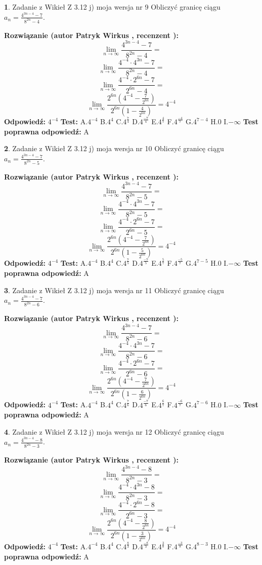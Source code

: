 \documentclass[12pt, a4paper]{article}
\theoremstyle{definition} %
\newtheorem{zad}{}
\newcommand{\zadStart}[1]{\begin{zad}#1\newline}
\newcommand{\zadStop}{\end{zad}}
\newcommand{\rozwStart}[2]{\noindent \textbf{Rozwiązanie (autor #1 , recenzent #2): }\newline}
\newcommand{\rozwStop}{\newline}
\newcommand{\odpStart}{\noindent \textbf{Odpowiedź:}\newline}
\newcommand{\odpStop}{\newline}
\newcommand{\testStart}{\noindent \textbf{Test:}\newline}
\newcommand{\testStop}{\newline}
\newcommand{\kluczStart}{\noindent \textbf{Test poprawna odpowiedź:}\newline}
\newcommand{\kluczStop}{\newline}
\begin{document}
\zadStart{Zadanie z Wikieł Z 3.12 j) moja wersja nr 9}
Obliczyć granicę ciągu $a_{n}=\frac{4^{3n-4}-7}{8^{2n}-4}$.
\zadStop
\rozwStart{Patryk Wirkus}{}
$$\lim\limits_{n\to\infty}\frac{4^{3n-4}-7}{8^{2n}-4}=$$
$$\lim\limits_{n\to\infty}\frac{4^{-4} \cdot 4^{3n}-7}{8^{2n}-4}=$$
$$\lim\limits_{n\to\infty}\frac{4^{-4} \cdot 2^{6n}-7}{2^{6n}-4}=$$
$$\lim\limits_{n\to\infty}\frac{2^{6n}(4^{-4} - \frac{7}{2^{6n}})}{2^{6n}(1-\frac{4}{2^{6n}})}= 4^{-4}$$
\rozwStop
\odpStart
$4^{-4}$
\odpStop
\testStart
A.$4^{-4}$
B.$4^{4}$
C.$4^{\frac{7}{4}}$
D.$4^{\frac{-7}{4}}$
E.$4^{\frac{4}{7}}$
F.$4^{\frac{-4}{7}}$
G.$4^{7-4}$
H.$0$
I.$-\infty$
\testStop
\kluczStart
A
\kluczStop



\zadStart{Zadanie z Wikieł Z 3.12 j) moja wersja nr 10}
Obliczyć granicę ciągu $a_{n}=\frac{4^{3n-4}-7}{8^{2n}-5}$.
\zadStop
\rozwStart{Patryk Wirkus}{}
$$\lim\limits_{n\to\infty}\frac{4^{3n-4}-7}{8^{2n}-5}=$$
$$\lim\limits_{n\to\infty}\frac{4^{-4} \cdot 4^{3n}-7}{8^{2n}-5}=$$
$$\lim\limits_{n\to\infty}\frac{4^{-4} \cdot 2^{6n}-7}{2^{6n}-5}=$$
$$\lim\limits_{n\to\infty}\frac{2^{6n}(4^{-4} - \frac{7}{2^{6n}})}{2^{6n}(1-\frac{5}{2^{6n}})}= 4^{-4}$$
\rozwStop
\odpStart
$4^{-4}$
\odpStop
\testStart
A.$4^{-4}$
B.$4^{4}$
C.$4^{\frac{7}{5}}$
D.$4^{\frac{-7}{5}}$
E.$4^{\frac{5}{7}}$
F.$4^{\frac{-5}{7}}$
G.$4^{7-5}$
H.$0$
I.$-\infty$
\testStop
\kluczStart
A
\kluczStop



\zadStart{Zadanie z Wikieł Z 3.12 j) moja wersja nr 11}
Obliczyć granicę ciągu $a_{n}=\frac{4^{3n-4}-7}{8^{2n}-6}$.
\zadStop
\rozwStart{Patryk Wirkus}{}
$$\lim\limits_{n\to\infty}\frac{4^{3n-4}-7}{8^{2n}-6}=$$
$$\lim\limits_{n\to\infty}\frac{4^{-4} \cdot 4^{3n}-7}{8^{2n}-6}=$$
$$\lim\limits_{n\to\infty}\frac{4^{-4} \cdot 2^{6n}-7}{2^{6n}-6}=$$
$$\lim\limits_{n\to\infty}\frac{2^{6n}(4^{-4} - \frac{7}{2^{6n}})}{2^{6n}(1-\frac{6}{2^{6n}})}= 4^{-4}$$
\rozwStop
\odpStart
$4^{-4}$
\odpStop
\testStart
A.$4^{-4}$
B.$4^{4}$
C.$4^{\frac{7}{6}}$
D.$4^{\frac{-7}{6}}$
E.$4^{\frac{6}{7}}$
F.$4^{\frac{-6}{7}}$
G.$4^{7-6}$
H.$0$
I.$-\infty$
\testStop
\kluczStart
A
\kluczStop



\zadStart{Zadanie z Wikieł Z 3.12 j) moja wersja nr 12}
Obliczyć granicę ciągu $a_{n}=\frac{4^{3n-4}-8}{8^{2n}-3}$.
\zadStop
\rozwStart{Patryk Wirkus}{}
$$\lim\limits_{n\to\infty}\frac{4^{3n-4}-8}{8^{2n}-3}=$$
$$\lim\limits_{n\to\infty}\frac{4^{-4} \cdot 4^{3n}-8}{8^{2n}-3}=$$
$$\lim\limits_{n\to\infty}\frac{4^{-4} \cdot 2^{6n}-8}{2^{6n}-3}=$$
$$\lim\limits_{n\to\infty}\frac{2^{6n}(4^{-4} - \frac{8}{2^{6n}})}{2^{6n}(1-\frac{3}{2^{6n}})}= 4^{-4}$$
\rozwStop
\odpStart
$4^{-4}$
\odpStop
\testStart
A.$4^{-4}$
B.$4^{4}$
C.$4^{\frac{8}{3}}$
D.$4^{\frac{-8}{3}}$
E.$4^{\frac{3}{8}}$
F.$4^{\frac{-3}{8}}$
G.$4^{8-3}$
H.$0$
I.$-\infty$
\testStop
\kluczStart
A
\kluczStop
\end{document}
